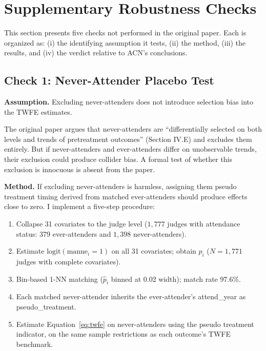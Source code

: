 \documentclass[12pt,a4paper]{article}
\begin{document}
\section{Supplementary Robustness Checks}
\label{sec:checks}

This section presents five checks not performed in the original paper. Each is organized as: (i) the identifying assumption it tests, (ii) the method, (iii) the results, and (iv) the verdict relative to ACN's conclusions.

\subsection{Check 1: Never-Attender Placebo Test}
\label{sec:check1}

\textbf{Assumption.} Excluding never-attenders does not introduce selection bias into the TWFE estimates.

The original paper argues that never-attenders are ``differentially selected on both levels and trends of pretreatment outcomes'' (Section IV.E) and excludes them entirely. But if never-attenders and ever-attenders differ on unobservable trends, their exclusion could produce collider bias. A formal test of whether this exclusion is innocuous is absent from the paper.

\textbf{Method.} If excluding never-attenders is harmless, assigning them pseudo treatment timing derived from matched ever-attenders should produce effects close to zero. I implement a five-step procedure:

\begin{enumerate}[nosep]
    \item Collapse 31 covariates to the judge level ($1,\!777$ judges with attendance status: 379 ever-attenders and $1,\!398$ never-attenders).
    \item Estimate $\text{logit}(\text{manne}_i = 1)$ on all 31 covariates; obtain $\hat{p}_i$ ($N = 1,\!771$ judges with complete covariates).
    \item Bin-based 1-NN matching ($\hat{p}_i$ binned at 0.02 width); match rate 97.6\%.
    \item Each matched never-attender inherits the ever-attender's attend\_year as pseudo\_treatment.
    \item Estimate Equation~\ref{eq:twfe} on never-attenders using the pseudo treatment indicator, on the same sample restrictions as each outcome's TWFE benchmark.
\end{enumerate}
\end{document}
